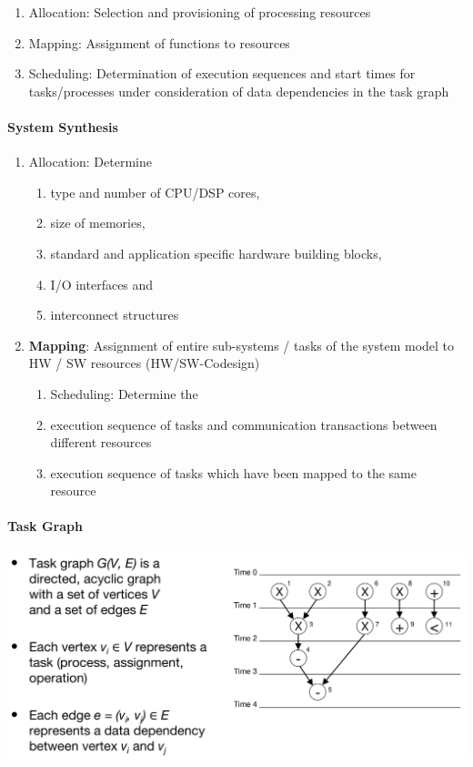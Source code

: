 \documentclass[english]{latex4ei/latex4ei_sheet}
\begin{document}
\begin{enumerate}
	\item Allocation: Selection and provisioning of processing resources
	\item Mapping: Assignment of functions to resources
	\item Scheduling: Determination of execution sequences and start times for tasks/processes under consideration of data dependencies in the task graph
\end{enumerate}

\paragraph{System Synthesis}
\begin{enumerate}
  \item Allocation: Determine
    \begin{enumerate}
      \item type and number of CPU/DSP cores,
      \item size of memories,
      \item standard and application specific hardware building blocks,
      \item  I/O interfaces and
      \item interconnect structures
    \end{enumerate}
  \item \textbf{Mapping}: Assignment of entire sub-systems / tasks of the system model to HW / SW resources (HW/SW-Codesign)
    \begin{enumerate}
      \item Scheduling: Determine the
      \item execution sequence of tasks and communication transactions between different resources
      \item execution sequence of tasks which have been mapped to the same resource
    \end{enumerate}
\end{enumerate}

\paragraph{Task Graph}

\begin{center}
  \includegraphics[width=\linewidth]{assets/TaskGraph.png}
  \label{fig:taskgraph}
\end{center}
\end{document}
